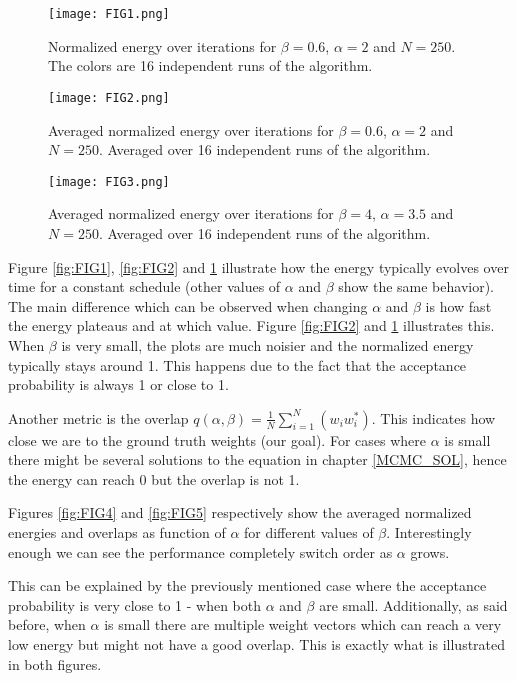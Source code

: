 \documentclass[a4paper]{article}
\begin{document}
\begin{figure}[!htb]
 \centering
{}
\centering
\texttt{[image: FIG1.png]}
\caption{\label{fig:FIG1}Normalized energy over iterations for $\beta = 0.6$, $\alpha = 2$ and $N = 250$. The colors are 16 independent runs of the algorithm.}
\endminipage\par\medskip
{}
\texttt{[image: FIG2.png]}
\caption{\label{fig:FIG2}Averaged normalized energy over iterations for $\beta = 0.6$, $\alpha = 2$ and $N = 250$. Averaged over 16 independent runs of the algorithm.}
\endminipage\hfill
{}%
\texttt{[image: FIG3.png]}
\caption{\label{fig:FIG3}Averaged normalized energy over iterations for $\beta = 4$, $\alpha = 3.5$ and $N = 250$. Averaged over 16 independent runs of the algorithm.}
\endminipage
\end{figure}


Figure \ref{fig:FIG1}, \ref{fig:FIG2} and \ref{fig:FIG3} illustrate how the energy typically evolves over time for a constant schedule (other values of $\alpha$ and $\beta$ show the same behavior). The main difference which can be observed when changing $\alpha$ and $\beta$ is how fast the energy plateaus and at which value. Figure \ref{fig:FIG2} and \ref{fig:FIG3} illustrates this. When $\beta$ is very small, the plots are much noisier and the normalized energy typically stays around 1. This happens due to the fact that the acceptance probability is always 1 or close to 1.

Another metric is the overlap $q(\alpha, \beta) = \frac{1}{N} \sum_{i = 1}^{N}(w_i w_{i}^{*})$. This indicates how close we are to the ground truth weights (our goal). For cases where $\alpha$ is small there might be several solutions to the equation in chapter \ref{MCMC_SOL}, hence the energy can reach 0 but the overlap is not 1.

Figures \ref{fig:FIG4} and \ref{fig:FIG5} respectively show the averaged normalized energies and overlaps as function of $\alpha$ for different values of $\beta$. Interestingly enough we can see the performance completely switch order as $\alpha$ grows.

This can be explained by the previously mentioned case where the acceptance probability is very close to 1 - when both $\alpha$ and $\beta$ are small. Additionally, as said before, when $\alpha$ is small there are multiple weight vectors which can reach a very low energy but might not have a good overlap. This is exactly what is illustrated in both figures.
\end{document}

